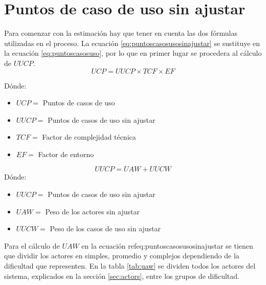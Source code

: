 \section{Puntos de caso de uso sin ajustar}

\par Para comenzar con la estimación hay que tener en cuenta las dos fórmulas utilizadas en el proceso. La ecuación \ref{eq:puntoscasosusosinajustar} se sustituye en la ecuación \ref{eq:puntoscasosuso}, por lo que en primer lugar se procedera al cálculo de $UUCP$.
\begin{equation} \label{eq:puntoscasosuso}
  UCP = UUCP \times TCF \times EF
\end{equation}

\text Dónde:
\begin{itemize}[-]
  \item $UCP =$ Puntos de casos de uso
  \item $UUCP =$ Puntos de casos de uso sin ajustar
  \item $TCF =$ Factor de complejidad técnica
  \item $EF =$ Factor de entorno
\end{itemize}


\begin{equation}\label{eq:puntoscasosusosinajustar}
  UUCP = UAW + UUCW
\end{equation}
\text Dónde:
\begin{itemize}[-]
  \item $UUCP =$ Puntos de casos de uso sin ajustar
  \item $UAW =$ Peso de los actores sin ajustar
  \item $UUCW =$ Peso de los casos de uso sin ajustar
\end{itemize}

\par Para el cálculo de $UAW$ en la ecuación ref{eq:puntoscasosusosinajustar} se tienen que dividir los actores en simples, promedio y complejos dependiendo de la dificultad que representen. En la tabla \ref{tab:uaw} se dividen todos los actores del sistema, explicados en la sección \ref{sec:actors}, entre los grupos de dificultad.

